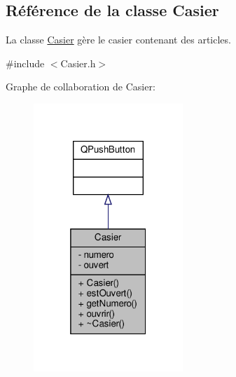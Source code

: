 \hypertarget{class_casier}{}\subsection{Référence de la classe Casier}
\label{class_casier}


La classe \hyperlink{class_casier}{Casier} gère le casier contenant des articles.  




{\ttfamily \#include $<$Casier.\+h$>$}



Graphe de collaboration de Casier\+:
\nopagebreak
\begin{figure}[H]
\begin{center}
\leavevmode
\includegraphics[width=160pt]{class_casier__coll__graph}
\end{center}
\end{figure}
